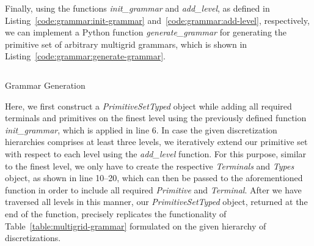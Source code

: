Finally, using the functions \emph{init\_grammar} and \emph{add\_level}, as defined in Listing~\ref{code:grammar:init-grammar} and~\ref{code:grammar:add-level}, respectively, we can implement a Python function \emph{generate\_grammar} for generating the primitive set of arbitrary multigrid grammars, which is shown in Listing~\ref{code:grammar:generate-grammar}.
\begin{listing}
	\inputminted[linenos]{python}{evostencils/grammar/generate_grammar.py}
	\caption{Grammar Generation}
	\label{code:grammar:generate-grammar}
\end{listing}
Here, we first construct a \emph{PrimitiveSetTyped} object while adding all required terminals and primitives on the finest level using the previously defined function \emph{init\_grammar}, which is applied in line 6.
In case the given discretization hierarchies comprises at least three levels, we iteratively extend our primitive set with respect to each level using the \emph{add\_level} function.
For this purpose, similar to the finest level, we only have to create the respective \emph{Terminals} and \emph{Types} object, as shown in line 10--20, which can then be passed to the aforementioned function in order to include all required \emph{Primitive} and \emph{Terminal}.
After we have traversed all levels in this manner, our \emph{PrimitiveSetTyped} object, returned at the end of the function, precisely replicates the functionality of Table~\ref{table:multigrid-grammar} formulated on the given hierarchy of discretizations. 

